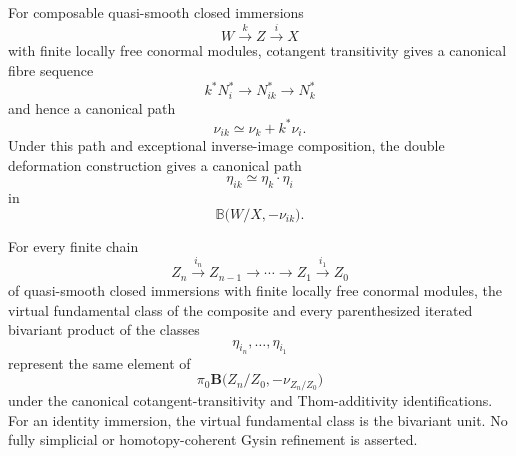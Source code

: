 \begin{theorem}
\label{thm:virtual-class-composition-coherence}
For composable quasi-smooth closed immersions
\[
    W\xrightarrow{k}Z\xrightarrow{i}X
\]
with finite locally free conormal modules, cotangent transitivity gives a
canonical fibre sequence
\[
    k^*N_i^*
    \longrightarrow
    N_{ik}^*
    \longrightarrow
    N_k^*
\]
and hence a canonical path
\[
    \nu_{ik}
    \simeq
    \nu_k+k^*\nu_i.
\]
Under this path and exceptional inverse-image composition, the double
deformation construction gives a canonical path
\[
    \eta_{ik}
    \simeq
    \eta_k\cdot\eta_i
\]
in
\[
    \mathbb B
    \bigl(
      W/X,
      -\nu_{ik}
    \bigr).
\]

For every finite chain
\[
    Z_n\xrightarrow{i_n}Z_{n-1}
    \longrightarrow\cdots\longrightarrow
    Z_1\xrightarrow{i_1}Z_0
\]
of quasi-smooth closed immersions with finite locally free conormal
modules, the virtual fundamental class of the composite and every
parenthesized iterated bivariant product of the classes
\[
    \eta_{i_n},\ldots,\eta_{i_1}
\]
represent the same element of
\[
    \pi_0\mathbf B
    \bigl(
      Z_n/Z_0,
      -\nu_{Z_n/Z_0}
    \bigr)
\]
under the canonical cotangent-transitivity and Thom-additivity
identifications.  For an identity immersion, the virtual fundamental class
is the bivariant unit.  No fully simplicial or homotopy-coherent Gysin
refinement is asserted.
\end{theorem}

